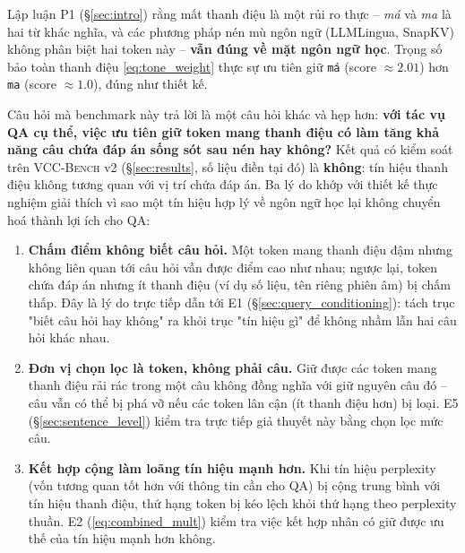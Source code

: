 \documentclass[12pt,a4paper]{article}
\newcommand{\token}[1]{\texttt{#1}}          %
\newcommand{\method}[1]{\textsc{#1}}         %
\newcommand{\viet}[1]{\textit{#1}}           %
\begin{document}
Lập luận P1 (\S\ref{sec:intro}) rằng mất thanh điệu là một rủi ro thực -- \viet{má} và \viet{ma} là hai từ khác nghĩa, và các phương pháp nén mù ngôn ngữ (LLMLingua, SnapKV) không phân biệt hai token này -- \textbf{vẫn đúng về mặt ngôn ngữ học}. Trọng số bảo toàn thanh điệu \eqref{eq:tone_weight} thực sự ưu tiên giữ \token{má} (score $\approx 2.01$) hơn \token{ma} (score $\approx 1.0$), đúng như thiết kế.

Câu hỏi mà benchmark này trả lời là một câu hỏi khác và hẹp hơn: \textbf{với tác vụ QA cụ thể, việc ưu tiên giữ token mang thanh điệu có làm tăng khả năng câu chứa đáp án sống sót sau nén hay không?} Kết quả có kiểm soát trên \method{VCC-Bench} v2 (\S\ref{sec:results}, số liệu điền tại đó) là \textbf{không}: tín hiệu thanh điệu không tương quan với vị trí chứa đáp án. Ba lý do khớp với thiết kế thực nghiệm giải thích vì sao một tín hiệu hợp lý về ngôn ngữ học lại không chuyển hoá thành lợi ích cho QA:

\begin{enumerate}[label=(\arabic*),leftmargin=*]
    \item \textbf{Chấm điểm không biết câu hỏi.} Một token mang thanh điệu đậm nhưng không liên quan tới câu hỏi vẫn được điểm cao như nhau; ngược lại, token chứa đáp án nhưng ít thanh điệu (ví dụ số liệu, tên riêng phiên âm) bị chấm thấp. Đây là lý do trực tiếp dẫn tới E1 (\S\ref{sec:query_conditioning}): tách trục "biết câu hỏi hay không" ra khỏi trục "tín hiệu gì" để không nhầm lẫn hai câu hỏi khác nhau.
    \item \textbf{Đơn vị chọn lọc là token, không phải câu.} Giữ được các token mang thanh điệu rải rác trong một câu không đồng nghĩa với giữ nguyên câu đó -- câu vẫn có thể bị phá vỡ nếu các token lân cận (ít thanh điệu hơn) bị loại. E5 (\S\ref{sec:sentence_level}) kiểm tra trực tiếp giả thuyết này bằng chọn lọc mức câu.
    \item \textbf{Kết hợp cộng làm loãng tín hiệu mạnh hơn.} Khi tín hiệu perplexity (vốn tương quan tốt hơn với thông tin cần cho QA) bị cộng trung bình với tín hiệu thanh điệu, thứ hạng token bị kéo lệch khỏi thứ hạng theo perplexity thuần. E2 (\eqref{eq:combined_mult}) kiểm tra việc kết hợp nhân có giữ được ưu thế của tín hiệu mạnh hơn không.
\end{enumerate}
\end{document}

